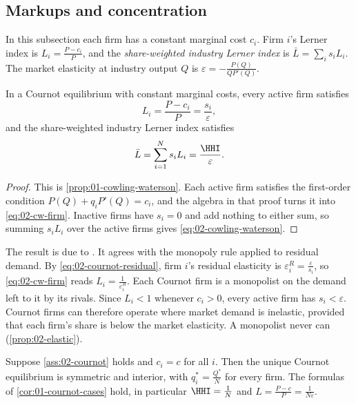 \subsection{Markups and concentration}\label{sec:02-cournot-markups}

In this subsection each firm has a constant marginal cost $c_i$. Firm $i$'s Lerner index is $L_i = \frac{P -
c_i}{P}$, and the \emph{share-weighted industry Lerner index} is $\bar L = \sum_i s_iL_i$. The market elasticity at
industry output $Q$ is $\varepsilon = -\frac{P(Q)}{QP'(Q)}$.

\begin{proposition}\label{prop:02-cowling-waterson}
In a Cournot equilibrium with constant marginal costs, every active firm satisfies
\begin{equation}\label{eq:02-cw-firm}
  L_i = \frac{P - c_i}{P} = \frac{s_i}{\varepsilon},
\end{equation}
and the share-weighted industry Lerner index satisfies
\begin{equation}\label{eq:02-cowling-waterson}
  \bar L = \sum_{i=1}^N s_iL_i = \frac{\HHI}{\varepsilon} .
\end{equation}
\end{proposition}

\begin{proof}
This is \cref{prop:01-cowling-waterson}. Each active firm satisfies the first-order condition
$P(Q) + q_iP'(Q) = c_i$, and the algebra in that proof turns it into \eqref{eq:02-cw-firm}. Inactive firms have
$s_i = 0$ and add nothing to either sum, so summing $s_iL_i$ over the active firms gives
\eqref{eq:02-cowling-waterson}.
\end{proof}

The result is due to \citet{CowlingWaterson1976}. It agrees with the monopoly rule applied to residual demand. By
\eqref{eq:02-cournot-residual}, firm $i$'s residual elasticity is $\varepsilon_i^R = \frac{\varepsilon}{s_i}$, so
\eqref{eq:02-cw-firm} reads $L_i = \frac{1}{\varepsilon_i^R}$. Each Cournot firm is a monopolist on the demand
left to it by its rivals. Since $L_i < 1$ whenever $c_i > 0$, every active firm has $s_i < \varepsilon$. Cournot
firms can therefore operate where market demand is inelastic, provided that each firm's share is below the market
elasticity. A monopolist never can (\cref{prop:02-elastic}).

\begin{corollary}\label{cor:02-cournot-symmetric}
Suppose \cref{ass:02-cournot} holds and $c_i = c$ for all $i$. Then the unique Cournot equilibrium is symmetric and
interior, with $q_i^* = \frac{Q^*}{N}$ for every firm. The formulas of \cref{cor:01-cournot-cases} hold, in
particular $\HHI = \frac{1}{N}$ and $L = \frac{P - c}{P} = \frac{1}{N\varepsilon}$.
\end{corollary}

